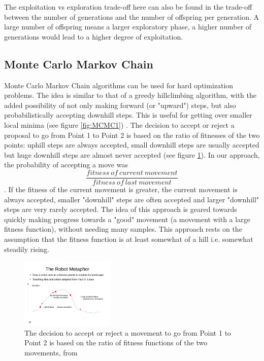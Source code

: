 The exploitation vs exploration trade-off here can also be found in the trade-off between the number of generations and the number of offspring per generation. A large number of offspring means a larger exploratory phase, a higher number of generations would lead to a higher degree of exploitation.

\subsection{Monte Carlo Markov Chain} \label{sec:MCMC}

Monte Carlo Markov Chain algorithms can be used for hard optimization problems. The idea is similar to that of a greedy hillclimbing algorithm, with the added possibility of not only making forward (or "upward") steps, but also probabilistically accepting downhill steps. This is useful for getting over smaller local minima (see figure \ref{fig:MCMC1}) \cite{MCMC}. The decision to accept or reject a proposal to go from Point 1 to Point 2 is based on the ratio of fitnesses of the two points: uphill steps are always accepted, small downhill steps are usually accepted but huge downhill steps are almost never accepted (see figure \ref{fig:MCMC2}). In our approach, the probability of accepting a move was $$\frac{fitness\ of\ current\ movement}{fitness\ of\ last\ movement}$$. If the fitness of the current movement is greater, the current movement is always accepted, smaller "downhill" steps are often accepted and larger "downhill" steps are very rarely accepted. The idea of this approach is geared towards quickly making progress towards a "good" movement (a movement with a large fitness function), without needing many samples. This approach rests on the assumption that the fitness function is at least somewhat of a hill i.e. somewhat steadily rising.

\begin{figure}
	\begin{center}
		\includegraphics[trim = 0cm 4cm 1cm 7cm, clip, width=0.4\textwidth]{lecture12-seiten-48}
	\end{center}
	\caption{The decision to accept or reject a movement to go from Point 1 to Point 2 is based on the ratio of fitness functions of the two movements, from \cite{MCMC}}
	\label{fig:MCMC2}
\end{figure}
